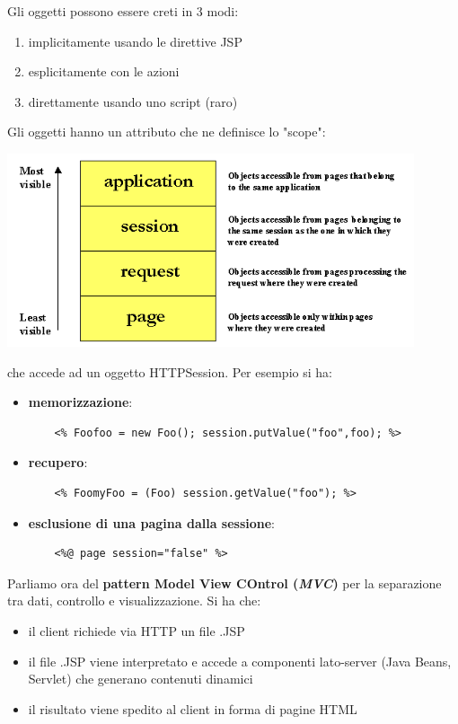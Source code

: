 \message{ !name(sd.tex)}\documentclass[a4paper,12pt, oneside]{book}
\begin{document}
Gli oggetti possono essere creti in 3 modi:
\begin{enumerate}
	\item implicitamente usando le direttive JSP
	\item esplicitamente con le azioni
	\item direttamente usando uno script (raro)
\end{enumerate}
Gli oggetti hanno un attributo che ne definisce lo "scope":
\begin{center}
	\includegraphics[scale=0.7]{img/scope.png}
\end{center}
che accede ad un oggetto HTTPSession. Per esempio si ha:
\begin{itemize}
	\item \textbf{memorizzazione}: 
	\begin{verbatim}
    <% Foofoo = new Foo(); session.putValue("foo",foo); %>
	\end{verbatim}
	\item \textbf{recupero}:
	\begin{verbatim}
    <% FoomyFoo = (Foo) session.getValue("foo"); %>
	\end{verbatim}
	\item \textbf{esclusione di una pagina dalla sessione}:
	\begin{verbatim}
    <%@ page session="false" %>
	\end{verbatim}
\end{itemize}
Parliamo ora del \textbf{pattern Model View COntrol (\textit{MVC})} per la separazione tra dati, controllo e visualizzazione. Si ha che:
\begin{itemize}
	\item il client richiede via HTTP un file .JSP
	\item il file .JSP viene interpretato e accede a componenti lato-server (Java Beans, Servlet) che generano contenuti dinamici  
	\item il risultato viene spedito al client in forma di pagine HTML 
\end{itemize}
\end{document}
